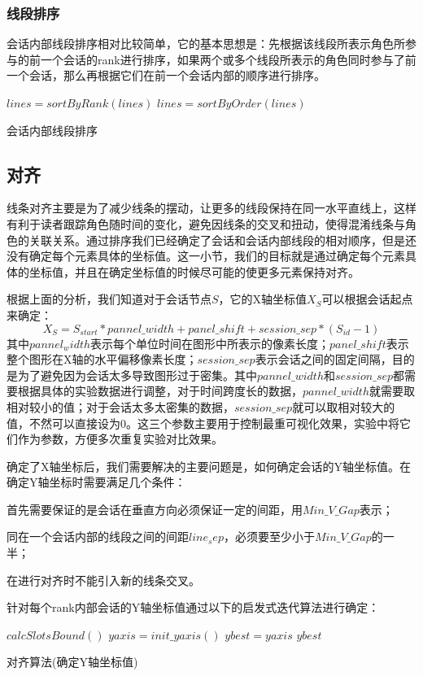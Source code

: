 \subsubsection{线段排序}
会话内部线段排序相对比较简单，它的基本思想是：先根据该线段所表示角色所参与的前一个会话的rank进行排序，如果两个或多个线段所表示的角色同时参与了前一个会话，那么再根据它们在前一个会话内部的顺序进行排序。
\begin{algorithm}[!htb]
  \BlankLine
  $lines = sortByRank(lines)$\;
  $lines = sortByOrder(lines)$\;
  \caption{会话内部线段排序}
  \label{algo:line-segment-order}
\end{algorithm}

\subsection{对齐}
线条对齐主要是为了减少线条的摆动，让更多的线段保持在同一水平直线上，这样有利于读者跟踪角色随时间的变化，避免因线条的交叉和扭动，使得混淆线条与角色的关联关系。通过排序我们已经确定了会话和会话内部线段的相对顺序，但是还没有确定每个元素具体的坐标值。这一小节，我们的目标就是通过确定每个元素具体的坐标值，并且在确定坐标值的时候尽可能的使更多元素保持对齐。

根据上面的分析，我们知道对于会话节点$S$，它的X轴坐标值$X_S$可以根据会话起点来确定：
\begin{equation}
\label{eq:x-axis}
X_S = S_{start} * pannel\_width + panel\_shift + session\_sep * (S_{id} -1)
\end{equation}
其中$pannel_width$表示每个单位时间在图形中所表示的像素长度；$panel\_shift$表示整个图形在X轴的水平偏移像素长度；$session\_sep$表示会话之间的固定间隔，目的是为了避免因为会话太多导致图形过于密集。其中$pannel\_width$和$session\_sep$都需要根据具体的实验数据进行调整，对于时间跨度长的数据，$pannel\_width$就需要取相对较小的值；对于会话太多太密集的数据，$session\_sep$就可以取相对较大的值，不然可以直接设为0。这三个参数主要用于控制最重可视化效果，实验中将它们作为参数，方便多次重复实验对比效果。

确定了X轴坐标后，我们需要解决的主要问题是，如何确定会话的Y轴坐标值。在确定Y轴坐标时需要满足几个条件：
\begin{inparaenum}[\itshape 1 \upshape)]
\item 首先需要保证的是会话在垂直方向必须保证一定的间距，用$Min\_V\_Gap$表示；
\item 同在一个会话内部的线段之间的间距$line_sep$，必须要至少小于$Min\_V\_Gap$的一半；
\item 在进行对齐时不能引入新的线条交叉。
\end{inparaenum}
针对每个rank内部会话的Y轴坐标值通过以下的启发式迭代算法进行确定：
\begin{algorithm}[!htb]
  $calcSlotsBound()$\;
  $yaxis = init\_yaxis()$\;
  $ybest = yaxis$\;
  \Return $ybest$\;
  \caption{对齐算法(确定Y轴坐标值)}
  \label{algo:alignment}
\end{algorithm}

